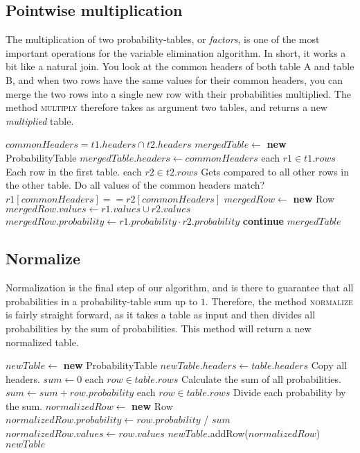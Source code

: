 \documentclass[10pt,a4paper]{article}
\begin{document}
\subsection{Pointwise multiplication}
The multiplication of two probability-tables, or \emph{factors}, is one of the most important operations for the variable elimination algorithm. In short, it works a bit like a natural join. You look at the common headers of both table A and table B, and when two rows have the same values for their common headers, you can merge the two rows into a single new row with their probabilities multiplied. The method \textsc{multiply} therefore takes as argument two tables, and returns a new \emph{multiplied} table.
\begin{codebox}
\li $commonHeaders = t1.headers \cap t2.headers$
\li $mergedTable \gets $ \textbf{new} ProbabilityTable
\li $mergedTable.headers \gets commonHeaders$
\zi
\li \For each $r1 \in t1.rows$ \Comment Each row in the first table. \Do
\li     \For each $r2 \in t2.rows$ \Comment Gets compared to all other rows in the other table. \Do
\zi         \Comment Do all values of the common headers match?
\li         \If $r1[commonHeaders] == r2[commonHeaders]$ \Then
\li             $mergedRow \gets $ \textbf{new} Row
\li             $mergedRow.values \gets r1.values \cup r2.values$
\li             $mergedRow.probability \gets r1.probability \cdot r2.probability$
\li         \Else
\li             \textbf{continue}
            \End
        \End
    \End
\zi
\li \Return $mergedTable$
\end{codebox}
\subsection{Normalize}
Normalization is the final step of our algorithm, and is there to guarantee that all probabilities in a probability-table sum up to $1$. Therefore, the method \textsc{normalize} is fairly straight forward, as it takes a table as input and then divides all probabilities by the sum of probabilities. This method will return a new normalized table.
\begin{codebox}
\li $newTable \gets $ \textbf{new} ProbabilityTable
\li $newTable.headers \gets table.headers$ \Comment Copy all headers.
\li $sum \gets 0$
\li \For each $row \in table.rows$ \Comment Calculate the sum of all probabilities. \Do
\li     $sum \gets sum + row.probability$
    \End
\li \For each $row \in table.rows$ \Comment Divide each probability by the sum. \Do
\li     $normalizedRow \gets $ \textbf{new} Row
\li     $normalizedRow.probability \gets row.probability$ / $sum$
\li     $normalizedRow.values \gets row.values$
\li     $newTable$.{\sc addRow}($normalizedRow$)
    \End
\li \Return $newTable$
\end{codebox}
\end{document}
